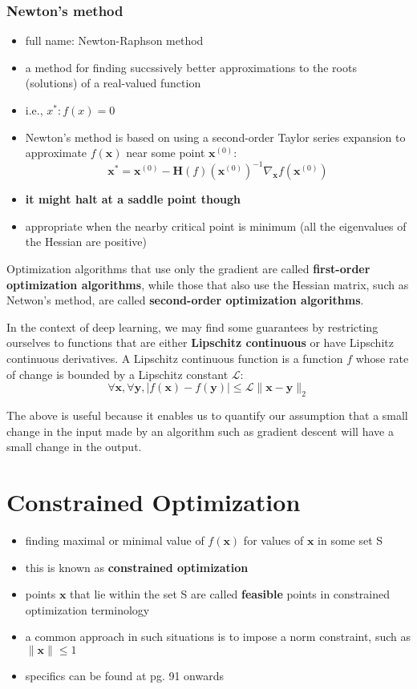\documentclass[11pt, twocolumn]{report}
\begin{document}
\subsubsection{Newton's method}
\begin{itemize}
  \item full name: Newton-Raphson method
  \item a method for finding succssively better approximations to the roots
    (solutions) of a real-valued function
  \item i.e., $x^* : f(x) = 0$
  \item Newton's method is based on using a second-order Taylor series
    expansion to approximate $f(\bm{x})$ near some point $\bm{x}^{(0)}$:
    \begin{equation}
      \bm{x}^* = \bm{x}^{(0)} -
      \bm{H}(f)(\bm{x}^{(0)})^{-1}\nabla_{\bm{x}}f(\bm{x}^{(0)})
    \end{equation}
  \item \textbf{it might halt at a saddle point though}
  \item appropriate when the nearby critical point is minimum (all the
    eigenvalues of the Hessian are positive)
\end{itemize}

Optimization algorithms that use only the gradient are called
\textbf{first-order optimization algorithms}, while those that also use the
Hessian matrix, such as Netwon's method, are called \textbf{second-order
  optimization algorithms}.

In the context of deep learning, we may find some guarantees by restricting
ourselves to functions that are either \textbf{Lipschitz continuous} or have
Lipschitz continuous derivatives. A Lipschitz continuous function is a function
$f$ whose rate of change is bounded by a Lipschitz constant $\mathcal{L}$:
\begin{equation}
  \forall \bm{x}, \forall \bm{y},
  | f(\bm{x}) - f(\bm{y}) | \leq \mathcal{L} \| \bm{x} - \bm{y} \|_2
\end{equation}

The above is useful because it enables us to quantify our assumption that a
small change in the input made by an algorithm such as gradient descent will
have a small change in the output.

\section{Constrained Optimization}
\begin{itemize}
  \item finding maximal or minimal value of $f(\bm{x})$ for values of $\bm{x}$
    in some set S
  \item this is known as \textbf{constrained optimization}
  \item points $\bm{x}$ that lie within the set S are called \textbf{feasible}
    points in constrained optimization terminology
  \item a common approach in such situations is to impose a norm constraint,
    such as $\|\bm{x}\| \leq 1$
  \item specifics can be found at pg. 91 onwards
\end{itemize}
\end{document}
